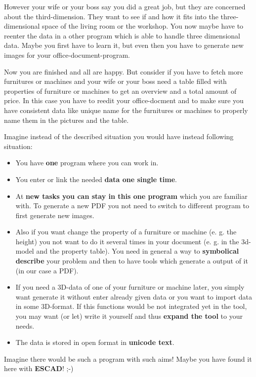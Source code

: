 \documentclass[a4paper, 12pt, openany]{scrbook}
\begin{document}
However your wife or your boss say you did a great job, but they are concerned about the third-dimension. They want to see if and how it fits into the three-dimensional space of the living room or the workshop. You now maybe have to reenter the data in a other program which is able to handle three dimensional data. Maybe you first have to learn it, but even then you have to generate new images for your office-document-program.

Now you are finished and all are happy. But consider if you have to fetch more furnitures or machines and your wife or your boss need a table filled with properties of furniture or machines to get an overview and a total amount of price. In this case you have to reedit your office-docment and to make sure you have consistent data like unique name for the furnitures or machines to properly name them in the pictures and the table.

Imagine instead of the described situation you would have instead following situation:
\begin{itemize}
\item You have \textbf{one} program where you can work in.
\item You enter or link the needed \textbf{data one single time}.
\item At \textbf{new tasks you can stay in this one program} which you are familiar with. To generate a new PDF you not need to switch to different program to first generate new images.
\item Also if you want change the property of a furniture or machine (e. g. the height) you not want to do it several times in your document (e. g. in the 3d-model and the property table). You need in general a way to \textbf{symbolical describe} your problem and then to have tools which generate a output of it (in our case a PDF).
\item If you need a 3D-data of one of your furniture or machine later, you simply want generate it without enter already given data or you want to import data in some 3D-format. If this functions would be not integrated yet in the tool, you may want (or let) write it yourself and thus \textbf{expand the tool} to your needs.
\item The data is stored in open format in \textbf{unicode text}.
\end{itemize}
  
Imagine there would be such a program with such aims! Maybe you have found it here with \textbf{ESCAD}! ;-)
\end{document}
